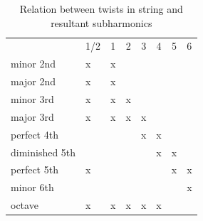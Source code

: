 \begin{table}
  \centering
  \caption{Relation between twists in string and resultant subharmonics}\label{tab:twistTable}
  \begin{tabular}{llllllll} 
  \toprule
  \multicolumn{1}{r}{} & \multicolumn{1}{c}{1/2} & \multicolumn{1}{c}{1} & \multicolumn{1}{c}{2} & \multicolumn{1}{c}{3} & \multicolumn{1}{c}{4} & \multicolumn{1}{c}{5} & \multicolumn{1}{c}{6}  \\ 
  minor 2nd            & x                       & x                     &                       &                       &                       &                       &                        \\
  major 2nd            & x                       & x                     &                       &                       &                       &                       &                        \\
  minor 3rd            & x                       & x                     & x                     &                       &                       &                       &                        \\
  major 3rd            & x                       & x                     & x                     & x                     &                       &                       &                        \\
  perfect 4th          &                         &                       &                       & x                     & x                     &                       &                        \\
  diminished 5th       &                         &                       &                       &                       & x                     & x                     &                        \\
  perfect 5th          & x                       &                       &                       &                       &                       & x                     & x                      \\
  minor 6th            &                         &                       &                       &                       &                       &                       & x                      \\
  octave               & x                       & x                     & x                     & x                     & x                     &                       &                        \\
  \bottomrule
  \end{tabular}
  \end{table}

